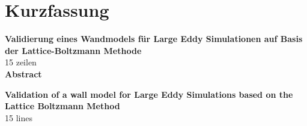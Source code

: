 \chapter*{Kurzfassung}
\thispagestyle{empty}
\vspace{0cm}

\textbf{\large Validierung eines Wandmodels für Large Eddy Simulationen auf Basis der Lattice-Boltzmann Methode}\\


15 zeilen
\vspace{2cm}  \\
{\bfseries \sffamily \huge Abstract}
\vspace{1cm}

\textbf{\large Validation of a wall model for Large Eddy Simulations based on the Lattice Boltzmann Method}\\

15 lines \\